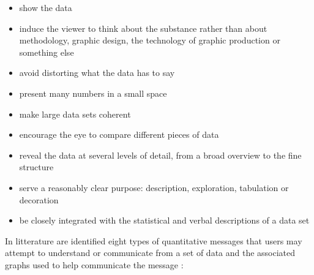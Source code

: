 \documentclass[]{book}
\providecommand{\tightlist}{%
  \setlength{\itemsep}{0pt}\setlength{\parskip}{0pt}}
\begin{document}
\begin{itemize}
\tightlist
\item
  show the data
\item
  induce the viewer to think about the substance rather than about
  methodology, graphic design, the technology of graphic production or
  something else
\item
  avoid distorting what the data has to say
\item
  present many numbers in a small space
\item
  make large data sets coherent
\item
  encourage the eye to compare different pieces of data
\item
  reveal the data at several levels of detail, from a broad overview to
  the fine structure
\item
  serve a reasonably clear purpose: description, exploration, tabulation
  or decoration
\item
  be closely integrated with the statistical and verbal descriptions of
  a data set
\end{itemize}

In litterature are identified eight types of quantitative messages that
users may attempt to understand or communicate from a set of data and
the associated graphs used to help communicate the message
\citep{few2012show}:
\end{document}
